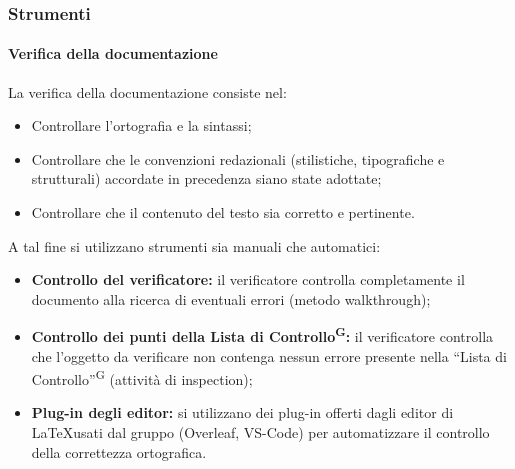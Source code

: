 \subsubsection{Strumenti}
\paragraph{Verifica della documentazione}
La verifica della documentazione consiste nel:
\begin{itemize}
    \item Controllare l'ortografia e la sintassi;
    \item Controllare che le convenzioni redazionali (stilistiche, tipografiche e strutturali) accordate in precedenza siano state adottate;
    \item Controllare che il contenuto del testo sia corretto e pertinente.
\end{itemize}
A tal fine si utilizzano strumenti sia manuali che automatici:
\begin{itemize}
    \item \textbf{Controllo del verificatore:} il verificatore controlla completamente il documento alla ricerca di eventuali errori (metodo walkthrough);
    \item \textbf{Controllo dei punti della Lista di Controllo\textsuperscript{G}:} il verificatore controlla che l'oggetto da verificare non contenga nessun errore presente nella ``Lista di Controllo''\textsuperscript{G} (attività di inspection);
    \item \textbf{Plug-in degli editor:} si utilizzano dei plug-in offerti dagli editor di \LaTeX\space usati dal gruppo (Overleaf, VS-Code) per automatizzare il controllo della correttezza ortografica.
\end{itemize}

